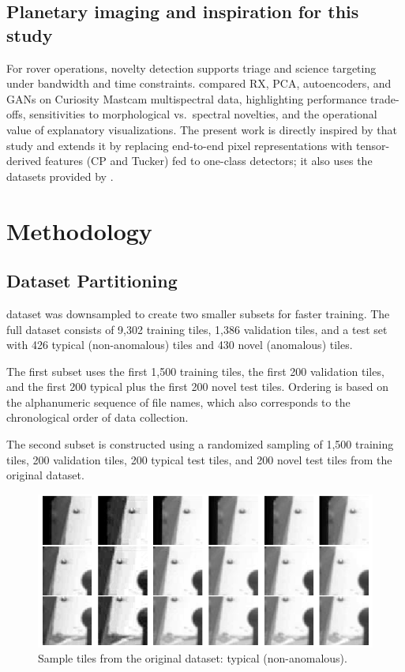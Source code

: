 \documentclass[11pt]{article}
\begin{document}
\subsection{Planetary imaging and inspiration for this study}
For rover operations, novelty detection supports triage and science targeting under bandwidth and time constraints. \citet{Kerner2020} compared RX, PCA, autoencoders, and GANs on Curiosity Mastcam multispectral data, highlighting performance trade-offs, sensitivities to morphological vs.\ spectral novelties, and the operational value of explanatory visualizations. The present work is directly inspired by that study and extends it by replacing end-to-end pixel representations with tensor-derived features (CP and Tucker) fed to one-class detectors; it also uses the datasets provided by \citet{Kerner2020}.



\section{Methodology}\label{sec:methodology}

\subsection{Dataset Partitioning}

\citet{Kerner2020} dataset was downsampled to create two smaller subsets for faster training. The full dataset consists of 9,302 training tiles, 1,386 validation tiles, and a test set with 426 typical (non-anomalous) tiles and 430 novel (anomalous) tiles.  

The first subset uses the first 1,500 training tiles, the first 200 validation tiles, and the first 200 typical plus the first 200 novel test tiles. Ordering is based on the alphanumeric sequence of file names, which also corresponds to the chronological order of data collection.  

The second subset is constructed using a randomized sampling of 1,500 training tiles, 200 validation tiles, 200 typical test tiles, and 200 novel test tiles from the original dataset.

\begin{figure}[H]
  \centering
  \includegraphics[width=\linewidth]{Raw images gray.png}
  \caption{Sample tiles from the original dataset: typical (non-anomalous).}
  \label{fig:dataset-samples}
\end{figure}
\end{document}

